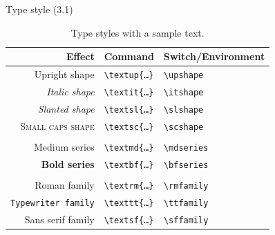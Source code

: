 \documentclass{beamer}
\newcommand{\switch}[1]{\texttt{\textbackslash#1}}
\newcommand{\command}[2]{\texttt{\textbackslash#1\{#2\}}}
\begin{document}
\begin{frame}{Type style (3.1)}

    \begin{table}[ht]
        \small
        \centering
        \begin{tabular}{rll}
            \toprule
            {\rmfamily\bfseries Effect}          & {\rmfamily\bfseries Command} & {\rmfamily\bfseries Switch/Environment} \\
            \midrule
            \textup{Upright shape}               & \command{textup}{\ldots}        & \switch{upshape}            \\
            \textit{Italic shape}                & \command{textit}{\ldots}        & \switch{itshape}            \\
            \textsl{Slanted shape}               & \command{textsl}{\ldots}        & \switch{slshape}            \\
            {\rmfamily\scshape{}Small caps shape} & \command{textsc}{\ldots}        & \switch{scshape}            \\
                                                 &                              &                             \\
            \textmd{Medium series}               & \command{textmd}{\ldots}        & \switch{mdseries}           \\
            \textbf{Bold series}                 & \command{textbf}{\ldots}        & \switch{bfseries}           \\
                                                 &                              &                             \\
            \textrm{Roman family}                & \command{textrm}{\ldots}        & \switch{rmfamily}           \\
            \texttt{Typewriter family}           & \command{texttt}{\ldots}        & \switch{ttfamily}           \\
            \textsf{Sans serif family}           & \command{textsf}{\ldots}        & \switch{sffamily}           \\
            \bottomrule
        \end{tabular}
        \caption{Type styles with a sample text.}\label{tbltypestyle}
    \end{table}
\end{frame}
\end{document}
